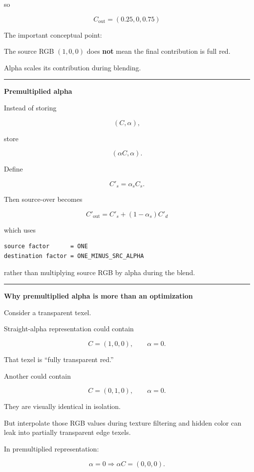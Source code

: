 so

\[
\boxed{
C_{\text{out}}
=
(0.25,0,0.75)
}
\]

The important conceptual point:

The source RGB \((1,0,0)\) does \textbf{not} mean the final contribution is full red.

Alpha scales its contribution during blending.

\begin{center}\rule{0.5\linewidth}{0.5pt}\end{center}

\textbf{Premultiplied alpha}

Instead of storing

\[
(C,\alpha),
\]

store

\[
(\alpha C,\alpha).
\]

Define

\[
C'_s=\alpha_s C_s.
\]

Then source-over becomes

\[
\boxed{
C'_{\text{out}}
=
C'_s+(1-\alpha_s)C'_d
}
\]

which uses

\begin{verbatim}
source factor      = ONE
destination factor = ONE_MINUS_SRC_ALPHA
\end{verbatim}

rather than multiplying source RGB by alpha during the blend.

\begin{center}\rule{0.5\linewidth}{0.5pt}\end{center}

\textbf{Why premultiplied alpha is more than an optimization}

Consider a transparent texel.

Straight-alpha representation could contain

\[
C=(1,0,0),\qquad \alpha=0.
\]

That texel is ``fully transparent red.''

Another could contain

\[
C=(0,1,0),\qquad \alpha=0.
\]

They are visually identical in isolation.

But interpolate those RGB values during texture filtering and hidden color can leak into partially transparent edge texels.

In premultiplied representation:

\[
\alpha=0
\Rightarrow
\alpha C=(0,0,0).
\]

